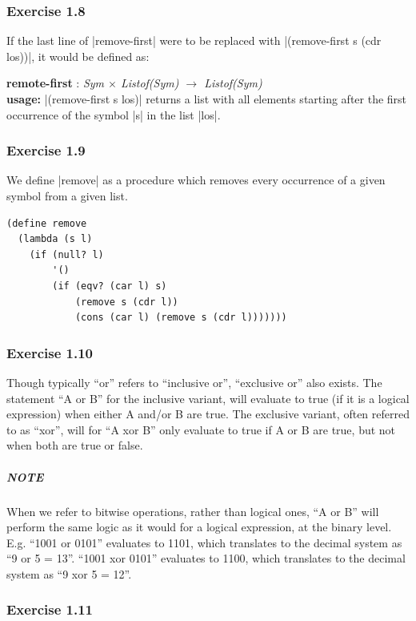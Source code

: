 \documentclass[a4paper]{article}
\begin{document}
\subsubsection{Exercise 1.8}

If the last line of |remove-first| were to be replaced with |(remove-first s (cdr los))|, it would be defined as:

\textbf{remote-first} : \textit{Sym $\times$ Listof(Sym) $\rightarrow$ Listof(Sym)}\\
\textbf{usage:} |(remove-first s los)| returns a list with all elements starting after the first occurrence of the symbol |s| in the list |los|.

\subsubsection{Exercise 1.9}

We define |remove| as a procedure which removes every occurrence of a given symbol from a given list.

\begin{lstlisting}
(define remove
  (lambda (s l)
    (if (null? l)
        '()
        (if (eqv? (car l) s)
            (remove s (cdr l))
            (cons (car l) (remove s (cdr l)))))))
\end{lstlisting}

\subsubsection{Exercise 1.10}

Though typically ``or'' refers to ``inclusive or'', ``exclusive or'' also exists. The statement ``A or B'' for the inclusive variant, will evaluate to true (if it is a logical expression) when either A and/or B are true. The exclusive variant, often referred to as ``xor'', will for ``A xor B'' only evaluate to true if A or B are true, but not when both are true or false.

\subparagraph{NOTE} When we refer to bitwise operations, rather than logical ones, ``A or B'' will perform the same logic as it would for a logical expression, at the binary level. E.g. ``1001 or 0101'' evaluates to 1101, which translates to the decimal system as ``9 or 5 = 13''. ``1001 xor 0101'' evaluates to 1100, which translates to the decimal system as ``9 xor 5 = 12''.

\subsubsection{Exercise 1.11}
\end{document}
